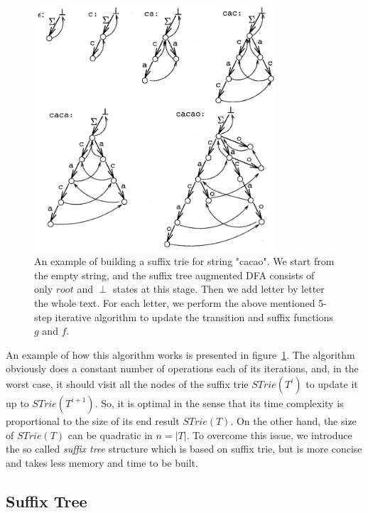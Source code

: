 \documentclass[paper=a4, fontsize=11pt]{scrartcl} %
\numberwithin{equation}{section} %
\numberwithin{figure}{section} %
\numberwithin{table}{section} %
\begin{document}
\begin{figure}[h!]
\centering
\includegraphics[width=0.8\textwidth]{figures/suffix-trie-eg.png}
\caption{An example of building a suffix trie for string "cacao". We start from the empty string, and the suffix tree augmented DFA consists of only $root$ and $\perp$ states at this stage. Then we add letter by letter the whole text. For each letter, we perform the above mentioned 5-step iterative algorithm to update the transition and suffix functions $g$ and $f$.}
\label{fig:siffix-trie}
\end{figure}

An example of how this algorithm works is presented in figure~\ref{fig:siffix-trie}. The algorithm obviously does a constant number of operations each of its iterations, and, in the worst case, it should visit all the nodes of the suffix trie $STrie(T^i)$ to update it up to $STrie(T^{i+1})$. So, it is optimal in the sense that its time complexity is proportional to the size of its end result $STrie(T)$. On the other hand, the size of $STrie(T)$ can be quadratic in $n = |T|$. To overcome this issue, we introduce the so called \textit{suffix tree} structure which is based on suffix trie, but is more concise and takes less memory and time to be built.

\subsection{Suffix Tree}
\end{document}
